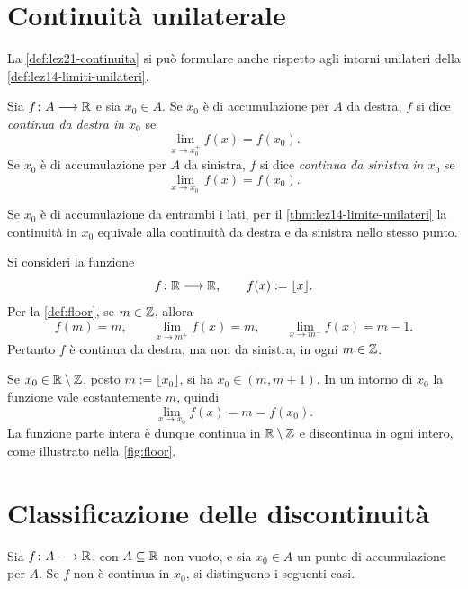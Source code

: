 \section{Continuità unilaterale}
\label{sec:lez21-continuita-unilaterale}

La \cref{def:lez21-continuita} si può formulare anche
rispetto agli intorni unilateri della
\cref{def:lez14-limiti-unilateri}.

\begin{definition}
\label{def:lez21-continuita-unilaterale}
Sia \(f\colon A\longrightarrow\mathbb{R}\) e sia \(x_0\in A\).
Se \(x_0\) è di accumulazione per \(A\) da destra,
\(f\) si dice \emph{continua da destra in \(x_0\)} se
\[
  \lim_{x\to x_0^+}f(x)=f(x_0).
\]
Se \(x_0\) è di accumulazione per \(A\) da sinistra,
\(f\) si dice \emph{continua da sinistra in \(x_0\)} se
\[
  \lim_{x\to x_0^-}f(x)=f(x_0).
\]
\end{definition}

Se \(x_0\) è di accumulazione da entrambi i lati,
per il \cref{thm:lez14-limite-unilateri} la continuità
in \(x_0\) equivale alla continuità da destra e da
sinistra nello stesso punto.

\clearpage

\begin{example}
\label{ex:lez21-continuita-floor}
Si consideri la funzione
\[
  f\colon\mathbb{R}\longrightarrow\mathbb{R},
  \qquad f(x):=\lfloor x\rfloor.
\]
Per la \cref{def:floor}, se \(m\in\mathbb{Z}\), allora
\[
  f(m)=m,
  \qquad
  \lim_{x\to m^+}f(x)=m,
  \qquad
  \lim_{x\to m^-}f(x)=m-1.
\]
Pertanto \(f\) è continua da destra, ma non da
sinistra, in ogni \(m\in\mathbb{Z}\).

Se \(x_0\in\mathbb{R}\setminus\mathbb{Z}\), posto
\(m:=\lfloor x_0\rfloor\), si ha
\(x_0\in(m,m+1)\). In un intorno di \(x_0\)
la funzione vale costantemente \(m\), quindi
\[
  \lim_{x\to x_0}f(x)=m=f(x_0).
\]
La funzione parte intera è dunque continua in
\(\mathbb{R}\setminus\mathbb{Z}\) e discontinua in ogni intero,
come illustrato nella \cref{fig:floor}.
\end{example}

\section{Classificazione delle discontinuità}
\label{sec:lez21-discontinuita}

Sia \(f\colon A\longrightarrow\mathbb{R}\), con
\(A\subseteq\mathbb{R}\) non vuoto, e sia \(x_0\in A\)
un punto di accumulazione per \(A\). Se \(f\)
non è continua in \(x_0\), si distinguono
i seguenti casi.

